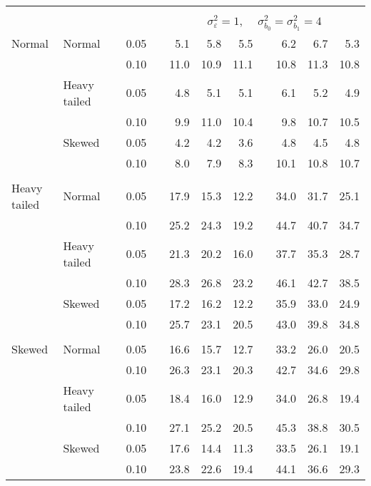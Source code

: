 \begin{table}[ht]
\begin{scriptsize}
\begin{center}
\begin{tabular}{ll p{.1cm} c p{.1cm} rrr p{.1cm} rrr}
&&&&&&&&&&&\\
& && && \multicolumn{7}{c}{$\sigma_{\varepsilon}^2 = 1$, \ \ $\sigma_{b_0}^2 = \sigma_{b_1}^2 = 4$} \\ \cline{6-12}
\rowcolor{gray!20}Normal       & Normal       && 0.05 &&   5.1 & 5.8 & 5.5 &   & 6.2 & 6.7 & 5.3 \\ 
\rowcolor{gray!20}             &              && 0.10 &&   11.0 & 10.9 & 11.1 &   & 10.8 & 11.3 & 10.8 \\ 
\rowcolor{gray!20}             & Heavy tailed && 0.05 &&   4.8 & 5.1 & 5.1 &   & 6.1 & 5.2 & 4.9 \\ 
\rowcolor{gray!20}             &              && 0.10 &&   9.9 & 11.0 & 10.4 &   & 9.8 & 10.7 & 10.5 \\ 
\rowcolor{gray!20}             & Skewed       && 0.05 &&   4.2 & 4.2 & 3.6 &   & 4.8 & 4.5 & 4.8 \\ 
\rowcolor{gray!20}             &              && 0.10 &&   8.0 & 7.9 & 8.3 &   & 10.1 & 10.8 & 10.7 \\ 
&&&&&&&&&&&\\
Heavy tailed & Normal       && 0.05 &&   17.9 & 15.3 & 12.2 &   & 34.0 & 31.7 & 25.1 \\ 
             &              && 0.10 &&   25.2 & 24.3 & 19.2 &   & 44.7 & 40.7 & 34.7 \\ 
             & Heavy tailed && 0.05 &&   21.3 & 20.2 & 16.0 &   & 37.7 & 35.3 & 28.7 \\ 
             &              && 0.10 &&   28.3 & 26.8 & 23.2 &   & 46.1 & 42.7 & 38.5 \\ 
             & Skewed       && 0.05 &&   17.2 & 16.2 & 12.2 &   & 35.9 & 33.0 & 24.9 \\ 
             &              && 0.10 &&   25.7 & 23.1 & 20.5 &   & 43.0 & 39.8 & 34.8 \\ 
&&&&&&&&&&&\\
Skewed       & Normal       && 0.05 &&   16.6 & 15.7 & 12.7 &   & 33.2 & 26.0 & 20.5 \\ 
             &              && 0.10 &&   26.3 & 23.1 & 20.3 &   & 42.7 & 34.6 & 29.8 \\ 
             & Heavy tailed && 0.05 &&   18.4 & 16.0 & 12.9 &   & 34.0 & 26.8 & 19.4 \\ 
             &              && 0.10 &&   27.1 & 25.2 & 20.5 &   & 45.3 & 38.8 & 30.5 \\ 
             & Skewed       && 0.05 &&   17.6 & 14.4 & 11.3 &   & 33.5 & 26.1 & 19.1 \\ 
             &              && 0.10 &&   23.8 & 22.6 & 19.4 &   & 44.1 & 36.6 & 29.3 \\ 

\hline
\end{tabular}
\end{center}
\end{scriptsize}
\end{table}

